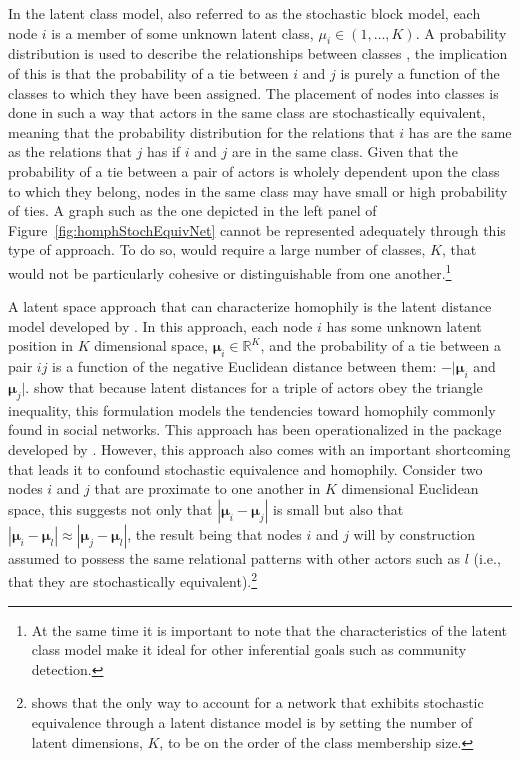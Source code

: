 In the latent class model, also referred to as the stochastic block model, each node $i$ is a member of some unknown latent class, $\mu_{i} \in (1,\ldots,K)$. A probability distribution is used to describe the relationships between classes  \citep{nowicki:snijders:2001}, the implication of this is that the probability of a tie between $i$ and $j$ is purely a function of the classes to which they have been assigned. The placement of nodes into classes is done in such a way that actors in the same class are stochastically equivalent, meaning that the probability distribution for the relations that $i$ has are the same as the relations that $j$ has if $i$ and $j$ are in the same class. Given that the probability of a tie between a pair of actors is wholely dependent upon the class to which they belong, nodes in the same class may have small or high probability of ties. A graph such as the one depicted in the left panel of Figure~\ref{fig:homphStochEquivNet} cannot be represented adequately through this type of approach. To do so, would require a large number of classes, $K$, that would not be particularly cohesive or distinguishable from one another.\footnote{At the same time it is important to note that the characteristics of the latent class model make it ideal for other inferential goals such as community detection.}

A latent space approach that can characterize homophily is the latent distance model developed by \citet{hoff:etal:2002}. In this approach, each node $i$ has some unknown latent position in $K$ dimensional space, $\bm\mu_{i} \in \mathbb{R}^{K}$, and the probability of a tie between a pair $ij$ is a function of the negative Euclidean distance between them: $-|\bm\mu_{i}$ and $\bm\mu_{j}|$. \citet{hoff:etal:2002} show that because latent distances for a triple of actors obey the triangle inequality, this formulation models the tendencies toward homophily commonly found in social networks. This approach has been operationalized in the  package developed by \citet{krivitsky:handcock:2015}. However, this approach also comes with an important shortcoming that leads it to confound stochastic equivalence and homophily. Consider two nodes $i$ and $j$ that are proximate to one another in $K$ dimensional Euclidean space, this suggests not only that $|\bm\mu_{i} - \bm\mu_{j}|$ is small but also that $|\bm\mu_{i} - \bm\mu_{l}| \approx |\bm\mu_{j} - \bm\mu_{l}|$, the result being that nodes $i$ and $j$ will by construction assumed to possess the same relational patterns with other actors such as $l$ (i.e., that they are stochastically equivalent).\footnote{\citet{hoff:2008} shows that the only way to account for a network that exhibits stochastic equivalence through a latent distance model is by setting the number of latent dimensions, $K$, to be on the order of the class membership size.} 

